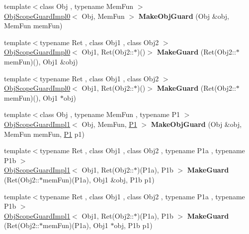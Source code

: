 \begin{DoxyCompactItemize}
\item 
\hypertarget{namespaceLoki_ab7e672dc347c78b2c9145853c6de102d}{}{\footnotesize template$<$class Obj , typename Mem\+Fun $>$ }\\\hyperlink{classLoki_1_1ObjScopeGuardImpl0}{Obj\+Scope\+Guard\+Impl0}$<$ Obj, Mem\+Fun $>$ {\bfseries Make\+Obj\+Guard} (Obj \&obj, Mem\+Fun mem\+Fun)\label{namespaceLoki_ab7e672dc347c78b2c9145853c6de102d}

\item 
\hypertarget{namespaceLoki_a075293ab7a8c6eddef2e38484ea0e678}{}{\footnotesize template$<$typename Ret , class Obj1 , class Obj2 $>$ }\\\hyperlink{classLoki_1_1ObjScopeGuardImpl0}{Obj\+Scope\+Guard\+Impl0}$<$ Obj1, Ret(Obj2\+::$\ast$)()$>$ {\bfseries Make\+Guard} (Ret(Obj2\+::$\ast$mem\+Fun)(), Obj1 \&obj)\label{namespaceLoki_a075293ab7a8c6eddef2e38484ea0e678}

\item 
\hypertarget{namespaceLoki_ac9f57631ab483dbb661619db9705f965}{}{\footnotesize template$<$typename Ret , class Obj1 , class Obj2 $>$ }\\\hyperlink{classLoki_1_1ObjScopeGuardImpl0}{Obj\+Scope\+Guard\+Impl0}$<$ Obj1, Ret(Obj2\+::$\ast$)()$>$ {\bfseries Make\+Guard} (Ret(Obj2\+::$\ast$mem\+Fun)(), Obj1 $\ast$obj)\label{namespaceLoki_ac9f57631ab483dbb661619db9705f965}

\item 
\hypertarget{namespaceLoki_a68d92eb727d4f9a7dcfa0c160e8086ed}{}{\footnotesize template$<$class Obj , typename Mem\+Fun , typename P1 $>$ }\\\hyperlink{classLoki_1_1ObjScopeGuardImpl1}{Obj\+Scope\+Guard\+Impl1}$<$ Obj, Mem\+Fun, \hyperlink{structP1}{P1} $>$ {\bfseries Make\+Obj\+Guard} (Obj \&obj, Mem\+Fun mem\+Fun, \hyperlink{structP1}{P1} p1)\label{namespaceLoki_a68d92eb727d4f9a7dcfa0c160e8086ed}

\item 
\hypertarget{namespaceLoki_a8b299506b95756c0415bd28d27f16d32}{}{\footnotesize template$<$typename Ret , class Obj1 , class Obj2 , typename P1a , typename P1b $>$ }\\\hyperlink{classLoki_1_1ObjScopeGuardImpl1}{Obj\+Scope\+Guard\+Impl1}$<$ Obj1, Ret(Obj2\+::$\ast$)(P1a), P1b $>$ {\bfseries Make\+Guard} (Ret(Obj2\+::$\ast$mem\+Fun)(P1a), Obj1 \&obj, P1b p1)\label{namespaceLoki_a8b299506b95756c0415bd28d27f16d32}

\item 
\hypertarget{namespaceLoki_a8fa910e38d54499c5a02e1de93129b71}{}{\footnotesize template$<$typename Ret , class Obj1 , class Obj2 , typename P1a , typename P1b $>$ }\\\hyperlink{classLoki_1_1ObjScopeGuardImpl1}{Obj\+Scope\+Guard\+Impl1}$<$ Obj1, Ret(Obj2\+::$\ast$)(P1a), P1b $>$ {\bfseries Make\+Guard} (Ret(Obj2\+::$\ast$mem\+Fun)(P1a), Obj1 $\ast$obj, P1b p1)\label{namespaceLoki_a8fa910e38d54499c5a02e1de93129b71}


\end{DoxyCompactItemize}
